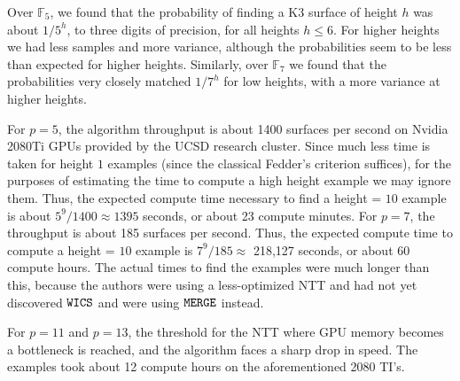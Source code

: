 Over \(\mathbb{F}_{5}\), we 
found that the probability of finding a K3 surface
of height \(h\) was about \(1 / 5^{h}\), to three digits
of precision, for all heights \(h \leq 6\).
For higher heights we had less samples
and more variance, although
the probabilities seem to be less than expected
for higher heights.
Similarly, over \(\mathbb{F}_{7}\) we found that
the probabilities very closely matched \(1 / 7^{h}\) 
for low heights, with a more variance at higher heights.

For \(p=5\), the algorithm throughput is about
1400 surfaces per second on 
Nvidia 2080Ti GPUs provided by the 
UCSD research cluster.
Since much less time is taken for height \(1\) examples
(since the classical Fedder's criterion suffices), 
for the purposes of estimating the time to compute a
high height example we may ignore them.
Thus,
the expected compute time necessary to find a height = \(10\) 
example is about  \(5^{9} / 1400 \approx 1395\) seconds, or about 
23 compute minutes.
For \(p=7\), the throughput is about 185 surfaces
per second.
Thus, the expected compute time to compute
a height = \(10\) example is 
\(7^{9} / 185 \approx \) 218,127 seconds, or about 
60 compute hours.
The actual times to find the examples were much 
longer than this, because the authors were using a 
less-optimized NTT and had not yet discovered \(\wics\) 
and were using \(\merge\) instead.

For $p = 11$ and $p = 13$, the threshold for the NTT where 
GPU memory becomes a bottleneck is reached, and the algorithm 
faces a sharp drop in speed. The examples took about 12 compute hours
on the aforementioned 2080 TI's.

